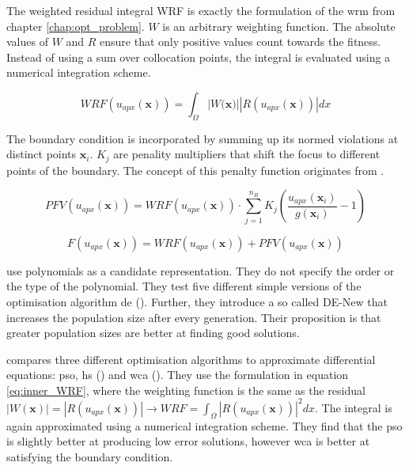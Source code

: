 \documentclass[./\jobname.tex]{subfiles}
\begin{document}
The weighted residual integral WRF is exactly the formulation of the \gls{wrm} from chapter \ref{chap:opt_problem}. $W$ is an arbitrary weighting function. The absolute values of $W$ and $R$ ensure that only positive values count towards the fitness. Instead of using a sum over collocation points, the integral is evaluated using a numerical integration scheme.

\begin{equation}
\label{eq:inner_WRF}
WRF(u_{apx}(\mathbf{x})) = \int_{\Omega} |W(\mathbf{x)}| |R(u_{apx}(\mathbf{x}))| dx
\end{equation} 

The boundary condition is incorporated by summing up its normed violations at distinct points $\mathbf{x}_i$. $K_j$ are penality multipliers that shift the focus to different points of the boundary. The concept of this penalty function originates from \cite{rajeev_discrete_1992}.

\begin{equation}
\label{eq:boundary_penalty}
PFV(u_{apx}(\mathbf{x})) = WRF(u_{apx}(\mathbf{x})) \cdot \sum_{j=1}^{n_B} K_j \left(\frac{u_{apx}(\mathbf{x}_i)}{g(\mathbf{x}_i)} - 1\right)
\end{equation}

\begin{equation}
\label{eq:inner_and_boundary_fitness}
F(u_{apx}(\mathbf{x})) = WRF(u_{apx}(\mathbf{x})) + PFV(u_{apx}(\mathbf{x}))
\end{equation}

\cite{panagant_solving_2014} use polynomials as a candidate representation. They do not specify the order or the type of the polynomial. They test five different simple versions of the optimisation algorithm \gls{de} (\cite{storn_differential_1997}). Further, they introduce a so called DE-New that increases the population size after every generation. Their proposition is that greater population sizes are better at finding good solutions. 

\cite{sadollah_metaheuristic_2017} compares three different optimisation algorithms to approximate differential equations: \gls{pso}, \gls{hs} (\cite{geem_new_2001}) and \gls{wca} (\cite{eskandar_water_2012}). They use the formulation in equation \eqref{eq:inner_WRF}, where the weighting function is the same as the residual $|W(\mathbf{x})| = |R(u_{apx}(\mathbf{x}))| \rightarrow WRF = \int_{\Omega} |R(u_{apx}(\mathbf{x}))|^2 dx$. The integral is again approximated using a numerical integration scheme. They find that the \gls{pso} is slightly better at producing low error solutions, however \gls{wca} is better at satisfying the boundary condition. 
\end{document}
